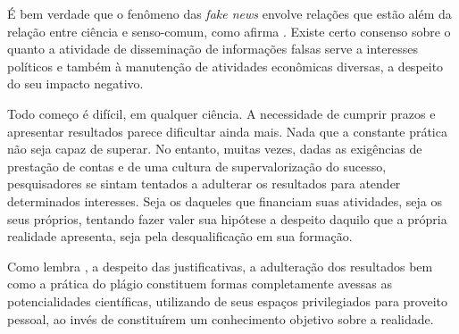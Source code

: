É bem verdade que o fenômeno das \textit{fake news} envolve relações que estão além da relação entre ciência e senso-comum, como afirma \citet{kakutani2018}. Existe certo consenso sobre o quanto a atividade de disseminação de informações falsas serve a interesses políticos e também à manutenção de atividades econômicas diversas, a despeito do seu impacto negativo.


Todo começo é difícil, em qualquer ciência. A necessidade de cumprir prazos e apresentar resultados parece dificultar ainda mais. Nada que a constante prática não seja capaz de superar. No entanto, muitas vezes, dadas as exigências de prestação de contas e de uma cultura de supervalorização do sucesso, pesquisadores se sintam tentados a adulterar os resultados para atender determinados interesses. Seja os daqueles que financiam suas atividades, seja os seus próprios, tentando fazer valer sua hipótese a despeito daquilo que a própria realidade apresenta, seja pela desqualificação em sua formação.

Como lembra \citet{eco2008}, a despeito das justificativas, a adulteração dos resultados bem como a prática do plágio constituem formas completamente avessas as potencialidades científicas, utilizando de seus espaços privilegiados para proveito pessoal, ao invés de constituírem um conhecimento objetivo sobre a realidade.


